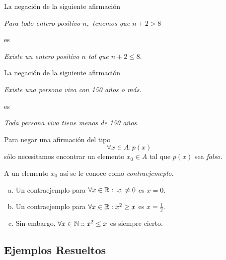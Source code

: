  \begin{problema}
  \label{lip:exmp:4.10.a}
  La negaci\'on de la siguiente afirmaci\'on
  \begin{center}
   \emph{Para todo entero positivo $n,$ tenemos que $n+2>8$}
  \end{center}
es 
\begin{center}
 \emph{Existe un entero positivo $n$ tal que $n+2 \leq 8.$}
\end{center}

 \end{problema}




 \begin{problema}
  \label{lip:exmp:4.10.b}
  La negaci\'on de la siguiente afirmaci\'on
  \begin{center}
   \emph{Existe una persona viva con 150 a\~nos o m\'as.}
  \end{center}
 es 
 \begin{center}
  \emph{Toda persona viva tiene menos de 150 a\~nos.}
 \end{center}

 \end{problema}




 \begin{rem}
  Para negar una afirmaci\'on del tipo $$\forall x \in A: p(x)$$ s\'olo necesitamos encontrar un elemento $x_{0}\in A$ tal que $p(x)$ sea \emph{falso.}
  
  
  A un elemento $x_{0}$ as\'i se le conoce como \emph{contraejemeplo.}
 \end{rem}




 \begin{problema}
 \label{lip:4.11}
  \begin{enumerate}[(a)]
   \item 
  Un contraejemplo para $\forall x \in \mathbb{R}: \left|x\right|\neq 0$ es $x=0.$  
   \item 
  Un contraejemplo para $\forall x \in \mathbb{R}: x^{2}\geq x$ es $x=\frac{1}{2}.$  
   \item 
  Sin embargo, $\forall x \in \mathbb{N}: : x^{2}\leq x$ es siempre cierto.
  \end{enumerate}

 \end{problema}



\subsection{Ejemplos Resueltos}

